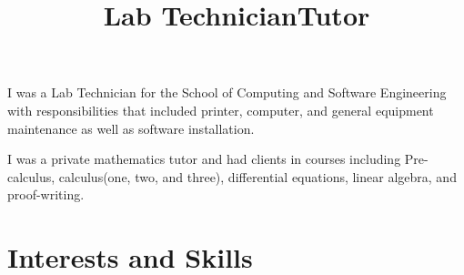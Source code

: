 \documentclass[margintitle,line]{res}
\renewcommand{\subsection}[1]{\section{\normalfont #1}}
\begin{document}
\begin{resume}
\title{Lab Technician}
\begin{position}
I was a Lab Technician  for the School of Computing and Software Engineering with responsibilities that included printer, computer, and general equipment maintenance as well as software installation.
\end{position}

\title{Tutor}
\begin{position}
I was a private mathematics tutor and had clients in courses including Pre-calculus, calculus(one, two, and three), differential equations, linear algebra, and proof-writing.
\end{position}






\setlength{\parskip}{1ex}





\section{Interests and Skills}


\end{resume}
\end{document}
